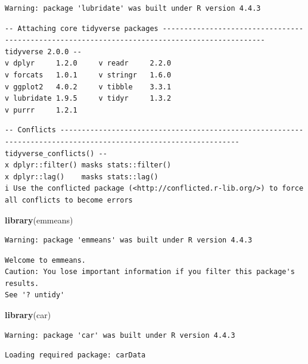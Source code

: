 \documentclass[
  landscape]{article}
\newenvironment{Shaded}{\begin{snugshade}}{\end{snugshade}}
\newcommand{\FunctionTok}[1]{\textcolor[rgb]{0.13,0.29,0.53}{\textbf{#1}}}
\newcommand{\NormalTok}[1]{#1}
\begin{document}
\begin{verbatim}
Warning: package 'lubridate' was built under R version 4.4.3
\end{verbatim}

\begin{verbatim}
-- Attaching core tidyverse packages ---------------------------------------------------------------------------------------------- tidyverse 2.0.0 --
v dplyr     1.2.0     v readr     2.2.0
v forcats   1.0.1     v stringr   1.6.0
v ggplot2   4.0.2     v tibble    3.3.1
v lubridate 1.9.5     v tidyr     1.3.2
v purrr     1.2.1     
\end{verbatim}

\begin{verbatim}
-- Conflicts ---------------------------------------------------------------------------------------------------------------- tidyverse_conflicts() --
x dplyr::filter() masks stats::filter()
x dplyr::lag()    masks stats::lag()
i Use the conflicted package (<http://conflicted.r-lib.org/>) to force all conflicts to become errors
\end{verbatim}

\begin{Shaded}
\begin{Highlighting}[]
\FunctionTok{library}\NormalTok{(emmeans)}
\end{Highlighting}
\end{Shaded}

\begin{verbatim}
Warning: package 'emmeans' was built under R version 4.4.3
\end{verbatim}

\begin{verbatim}
Welcome to emmeans.
Caution: You lose important information if you filter this package's results.
See '? untidy'
\end{verbatim}

\begin{Shaded}
\begin{Highlighting}[]
\FunctionTok{library}\NormalTok{(car)}
\end{Highlighting}
\end{Shaded}

\begin{verbatim}
Warning: package 'car' was built under R version 4.4.3
\end{verbatim}

\begin{verbatim}
Loading required package: carData
\end{verbatim}
\end{document}
